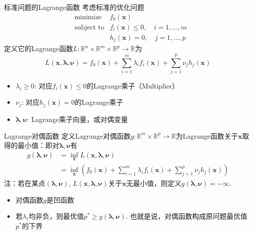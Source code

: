 \begin{frame}

\begin{block}{标准问题的Lagrange函数}
考虑标准的优化问题
\vspace{-0.5em}
\begin{eqnarray*}
& \text{minimize} & f_0(\mathbf{x}) \\
& \text{subject to} & f_i(\mathbf{x}) \le 0, \quad i = 1,\ldots,m \\
& & h_j(\mathbf{x}) = 0, \quad j = 1,\ldots,p
\end{eqnarray*}
定义它的Lagrange函数$L: \mathbb{R}^n \times \mathbb{R}^m \times \mathbb{R}^p \rightarrow \mathbb{R}$为
\vspace{-0.5em}
\[L(\mathbf{x}, \boldsymbol\lambda, \boldsymbol\nu) = f_0(\mathbf{x}) + \sum\limits_{i=1}^m \lambda_i f_i(\mathbf{x}) + \sum\limits_{j=1}^p \nu_j h_j(\mathbf{x})\]
\vspace{-1em}
\begin{itemize}
\item $\lambda_i \ge 0$: 对应$f_i(\mathbf{x}) \le 0$的Lagrange乘子（Multiplier）
\item $\nu_j$: 对应$h_j(\mathbf{x}) = 0$的Lagrange乘子
\item $\boldsymbol\lambda, \boldsymbol\nu$: Lagrange乘子向量，或对偶变量
\end{itemize}
\end{block}

\end{frame}


\begin{frame}

\begin{block}{Lagrange对偶函数}
定义Lagrange对偶函数$g: \mathbb{R}^m \times \mathbb{R}^p \rightarrow \mathbb{R}$为Lagrange函数关于$\mathbf{x}$取得的最小值：即对$\boldsymbol\lambda, \boldsymbol\nu$有
\begin{align*}
g(\boldsymbol\lambda, \boldsymbol\nu) & = \inf\limits_{\mathbf{x}} L(\mathbf{x}, \boldsymbol\lambda, \boldsymbol\nu) \\
& = \inf\limits_{\mathbf{x}} \left( f_0(\mathbf{x}) + \sum\limits_{i=1}^m \lambda_i f_i(\mathbf{x}) + \sum\limits_{j=1}^p \nu_j h_j(\mathbf{x}) \right)
\end{align*}
注：若在某点$(\boldsymbol\lambda, \boldsymbol\nu)$, $L(\mathbf{x}, \boldsymbol\lambda, \boldsymbol\nu)$关于$\mathbf{x}$无最小值，则定义$g(\boldsymbol\lambda, \boldsymbol\nu) = -\infty$.

\vspace{0.7em}
\pause

\begin{itemize}
\item 对偶函数$g$是凹函数
\item 若$\lambda_i$均非负，则最优值$p^* \ge g(\boldsymbol\lambda, \boldsymbol\nu)$. 也就是说，对偶函数构成原问题最优值$p^*$的下界
\end{itemize}
\end{block}

\end{frame}

